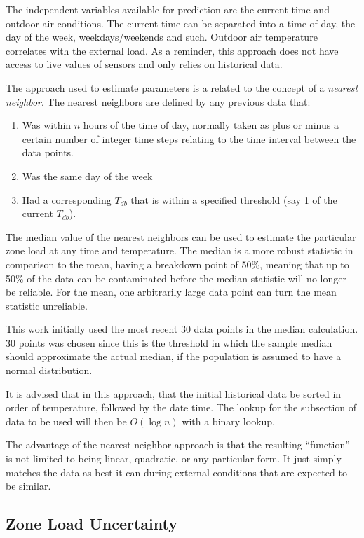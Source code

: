 The independent variables available for prediction are the current time
and outdoor air conditions. The current time can be separated into a
time of day, the day of the week, weekdays/weekends and such. Outdoor air
temperature correlates with the external load. As a reminder, this
approach does not have access to live values of sensors and only relies
on historical data.

The approach used to estimate parameters is a related to the concept of
a \textit{nearest neighbor}. The nearest neighbors are defined by any
previous data that:

\begin{enumerate}
    \item Was within \(n\) hours of the time of day, normally taken as
        plus or minus a certain number of integer time steps relating to
        the time interval between the data points.
\item Was the same day of the week
\item Had a corresponding \(T_{db}\) that is within a specified
    threshold (say \SI{1}{\degreeF} of the current \(T_{db}\)).
\end{enumerate}

The median value of the nearest neighbors can be used to estimate the
particular zone load at any time and temperature.  The median is a more robust
statistic in comparison to the mean, having a breakdown point of 50\%, meaning
that up to 50\% of the data can be contaminated before the median statistic
will no longer be reliable. For the mean, one arbitrarily large data point can
turn the mean statistic unreliable.

This work initially used the most recent 30 data points in the median calculation. 30 points
was chosen since this is the threshold in which the sample median should approximate
the actual median, if the population is assumed to have a normal distribution.

It is advised that in this approach, that the initial historical data be sorted
in order of temperature, followed by the date time.  The lookup for the
subsection of data to be used will then be \(O\left(\log n \right)\) with a
binary lookup.

The advantage of the nearest neighbor approach is that the resulting ``function''
is not limited to being linear, quadratic, or any particular form. It just
simply matches the data as best it can during external conditions that are
expected to be similar.

\subsection{Zone Load Uncertainty}

